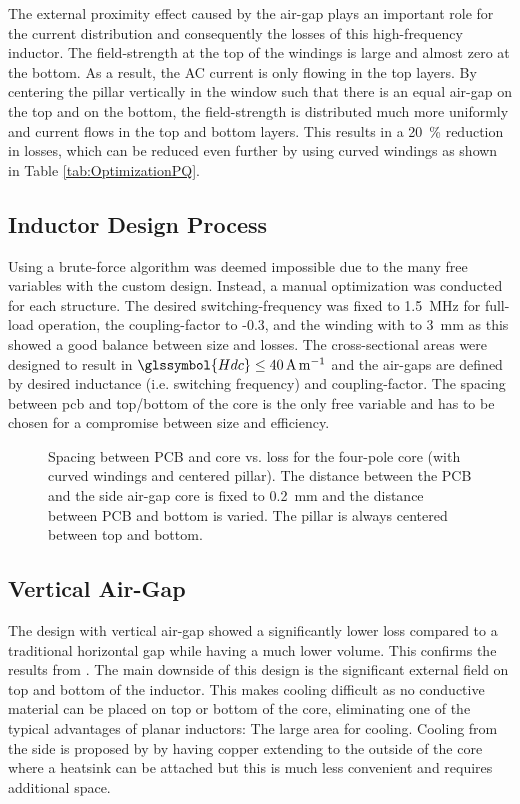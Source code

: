 \documentclass{IPEC2026}
\newcommand{\sbl}[1]{\glssymbol{#1}}
\newcommand{\ac}{\gls}
\begin{document}
The external proximity effect caused by the air-gap plays an important role for the current distribution and consequently the losses of this high-frequency inductor. The field-strength at the top of the windings is large and almost zero at the bottom. As a result, the AC current is only flowing in the top layers. By centering the pillar vertically in the window such that there is an equal air-gap on the top and on the bottom, the field-strength is distributed much more uniformly and current flows in the top and bottom layers. This results in a \qty{20}{\percent} reduction in losses, which can be reduced even further by using curved windings as shown in Table \ref{tab:OptimizationPQ}.

\subsection{Inductor Design Process}
Using a brute-force algorithm was deemed impossible due to the many free variables with the custom design. Instead, a manual optimization was conducted for each structure. The desired switching-frequency was fixed to \qty{1.5}{\MHz} for full-load operation, the coupling-factor to -0.3, and the winding with to \qty{3}{\mm} as this showed a good balance between size and losses. The cross-sectional areas were designed to result in $\sbl{Hdc} \leq \qty{40}{\A\per\m}$ and the air-gaps are defined by desired inductance (i.e. switching frequency) and coupling-factor. The spacing between \ac{pcb} and top/bottom of the core is the only free variable and has to be chosen for a compromise between size and efficiency.

\begin{figure}
  \centering
  
  \caption{Spacing between PCB and core vs. loss for the four-pole core (with curved windings and centered pillar). The distance between the PCB and the side air-gap core is fixed to \qty{0.2}{\mm} and the distance between PCB and bottom is varied. The pillar is always centered between top and bottom.}
  \label{fig:fourPole_spacingVsLoss}
\end{figure}

\subsection{Vertical Air-Gap}
The design with vertical air-gap showed a significantly lower loss compared to a traditional horizontal gap while having a much lower volume. This confirms the results from \cite{schaferNovelHighlyEfficient2020}. The main downside of this design is the significant external field on top and bottom of the inductor. This makes cooling difficult as no conductive material can be placed on top or bottom of the core, eliminating one of the typical advantages of planar inductors: The large area for cooling. Cooling from the side is proposed by \cite{schaferNovelHighlyEfficient2020} by having copper extending to the outside of the core where a heatsink can be attached but this is much less convenient and requires additional space.
\end{document}

